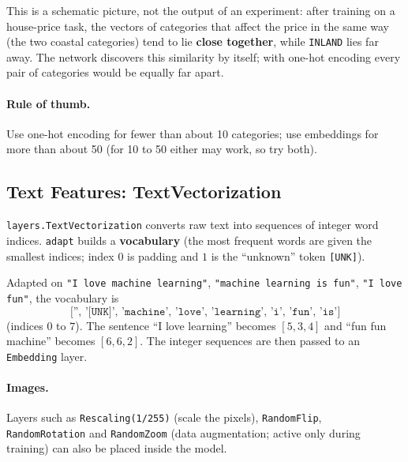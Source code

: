 \begin{explain}
This is a schematic picture, not the output of an experiment: after training on a house-price task, the vectors of categories that affect the price in the same way (the two coastal categories) tend to lie \textbf{close together}, while \texttt{INLAND} lies far away. The network discovers this similarity by itself; with one-hot encoding every pair of categories would be equally far apart.
\end{explain}

\paragraph{Rule of thumb.} Use one-hot encoding for fewer than about 10 categories; use embeddings for more than about 50 (for 10 to 50 either may work, so try both).

\subsection{Text Features: TextVectorization}

\begin{definition}
\texttt{layers.TextVectorization} converts raw text into sequences of integer word indices. \texttt{adapt} builds a \textbf{vocabulary} (the most frequent words are given the smallest indices; index $0$ is padding and $1$ is the ``unknown'' token \texttt{[UNK]}).
\end{definition}

\begin{example}
Adapted on \texttt{"I love machine learning"}, \texttt{"machine learning is fun"}, \texttt{"I love fun"}, the vocabulary is
\[
  \texttt{['', '[UNK]', 'machine', 'love', 'learning', 'i', 'fun', 'is']}
\]
(indices $0$ to $7$). The sentence ``I love learning'' becomes $[5,3,4]$ and ``fun fun machine'' becomes $[6,6,2]$. The integer sequences are then passed to an \texttt{Embedding} layer.
\end{example}

\paragraph{Images.} Layers such as \texttt{Rescaling(1/255)} (scale the pixels), \texttt{RandomFlip}, \texttt{RandomRotation} and \texttt{RandomZoom} (data augmentation; active only during training) can also be placed inside the model.


